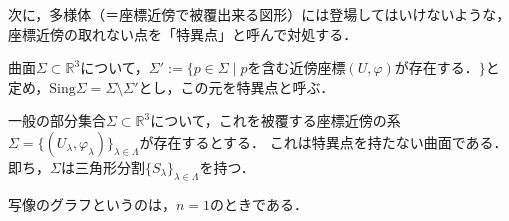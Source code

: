 \documentclass[uplatex, dvipdfmx]{jsreport}
\begin{document}
次に，多様体（＝座標近傍で被覆出来る図形）には登場してはいけないような，座標近傍の取れない点を「特異点」と呼んで対処する．
\begin{definition}
    曲面$\Sigma\subset\mathbb{R}^3$について，$\Sigma':=\{p\in\Sigma\mid pを含む近傍座標(U,\varphi)が存在する．\}$と定め，$\mathrm{Sing}\Sigma=\Sigma\setminus\Sigma'$とし，この元を特異点と呼ぶ．
\end{definition}
\begin{proposition}[多様体の定義]
    一般の部分集合$\Sigma\subset\mathbb{R}^3$について，これを被覆する座標近傍の系$\Sigma=\{(U_\lambda,\varphi_\lambda)\}_{\lambda\in\Lambda}$が存在するとする．
    これは特異点を持たない曲面である．即ち，$\Sigma$は三角形分割$\{S_\lambda\}_{\lambda\in\Lambda}$を持つ．
\end{proposition}
\begin{example}\label{example-graph}写像のグラフというのは，$n=1$のときである．


\end{example}
\end{document}
